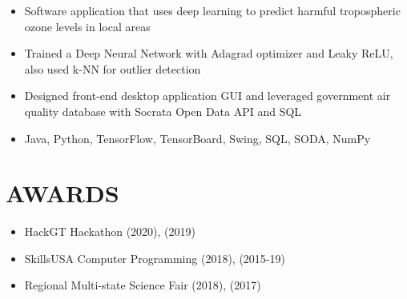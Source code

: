 \documentclass[11pt,letterpaper]{article}
\begin{document}
    \begin{itemize}
      \item{Software application that uses deep learning to predict harmful tropospheric ozone levels in local areas}
      
          \item{Trained a Deep Neural Network with Adagrad optimizer and Leaky ReLU, also used k-NN for outlier detection}
      
      \item{Designed front-end desktop application GUI and leveraged government air quality database with Socrata Open Data API and SQL}

      \item{
        {}
        Java, Python, TensorFlow, TensorBoard, Swing, SQL, SODA, NumPy
      }
    \end{itemize}
  \fi

  \bigskip

  
  \section*{AWARDS}

  \begin{itemize}
    \item{
      HackGT Hackathon \textemdash{}
      {}
      (2020),
      {}
      (2019)
    }



    \item{
      SkillsUSA Computer Programming
      \textemdash{}
      {}
      (2018),
      {}
      (2015-19)
    }

    \item{
      Regional Multi-state Science Fair
      \textemdash{}
      {}
      (2018),
      {}
      (2017)
    }
  \end{itemize}
\end{document}
